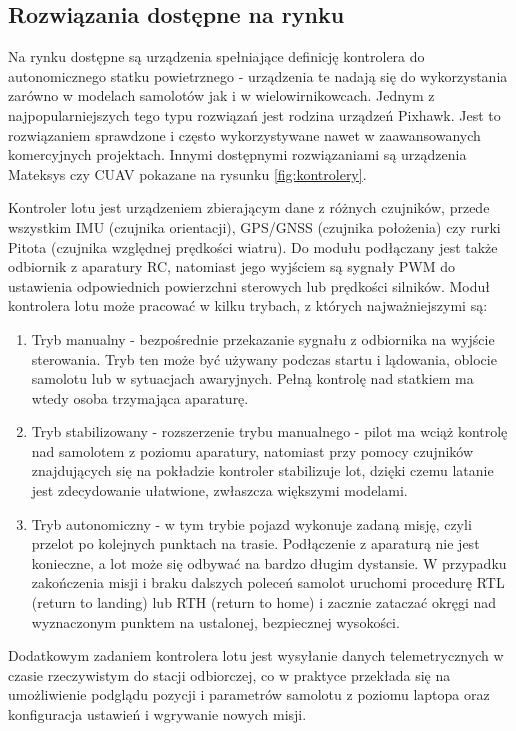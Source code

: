 \documentclass[12pt, a4paper]{article}
\begin{document}
\FloatBarrier
 
\subsection{Rozwiązania dostępne na rynku}
Na rynku dostępne są urządzenia spełniające definicję kontrolera do autonomicznego statku powietrznego - urządzenia te nadają się do wykorzystania zarówno w modelach samolotów jak i w wielowirnikowcach. Jednym z najpopularniejszych tego typu rozwiązań jest rodzina urządzeń Pixhawk. Jest to rozwiązaniem sprawdzone i często wykorzystywane nawet w zaawansowanych komercyjnych projektach. Innymi dostępnymi rozwiązaniami są urządzenia Mateksys czy CUAV pokazane na rysunku \ref{fig:kontrolery}.

Kontroler lotu jest urządzeniem zbierającym dane z różnych czujników, przede wszystkim IMU (czujnika orientacji), GPS/GNSS (czujnika położenia) czy rurki Pitota (czujnika względnej prędkości wiatru). Do modułu podłączany jest także odbiornik z aparatury RC, natomiast jego wyjściem są sygnały PWM do ustawienia odpowiednich powierzchni sterowych lub prędkości silników. 
Moduł kontrolera lotu może pracować w kilku trybach, z których najważniejszymi są:
\begin{enumerate}


	\item Tryb manualny - bezpośrednie przekazanie sygnału z odbiornika na wyjście sterowania. Tryb ten może być używany podczas startu i lądowania, oblocie samolotu lub w sytuacjach awaryjnych. Pełną kontrolę nad statkiem ma wtedy osoba trzymająca aparaturę.
	\item Tryb stabilizowany - rozszerzenie trybu manualnego - pilot ma wciąż kontrolę nad samolotem z poziomu aparatury, natomiast przy pomocy czujników znajdujących się na pokładzie kontroler stabilizuje lot, dzięki czemu latanie jest zdecydowanie ułatwione, zwłaszcza większymi modelami.
	\item Tryb autonomiczny - w tym trybie pojazd wykonuje zadaną misję, czyli przelot po kolejnych punktach na trasie. Podłączenie z aparaturą nie jest konieczne, a lot może się odbywać na bardzo długim dystansie. W przypadku zakończenia misji i braku dalszych poleceń samolot uruchomi procedurę RTL (return to landing) lub RTH (return to home) i zacznie zataczać okręgi nad wyznaczonym punktem na ustalonej, bezpiecznej wysokości.

\end{enumerate}
	
Dodatkowym zadaniem kontrolera lotu jest wysyłanie danych telemetrycznych w czasie rzeczywistym do stacji odbiorczej, co w praktyce przekłada się na umożliwienie podglądu pozycji i parametrów samolotu z poziomu laptopa oraz konfiguracja ustawień i wgrywanie nowych misji.
\end{document}

